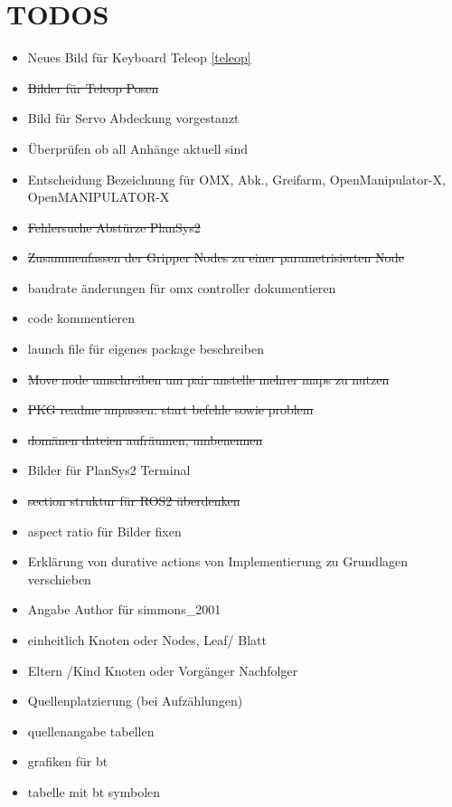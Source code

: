 \section{TODOS}
\begin{itemize}
    \item Neues Bild für Keyboard Teleop \ref{teleop}
    \item \sout{Bilder für Teleop Posen}
    \item Bild für Servo Abdeckung vorgestanzt
    \item Überprüfen ob all Anhänge aktuell sind
    \item Entscheidung Bezeichnung für OMX, Abk., Greifarm, OpenManipulator-X, OpenMANIPULATOR-X
    \item \sout{Fehlersuche Abstürze PlanSys2}
    \item \sout{Zusammenfassen der Gripper Nodes zu einer parametrisierten Node}
    \item baudrate änderungen für omx controller dokumentieren
    \item code kommentieren
    \item launch file für eigenes package beschreiben
    \item \sout{Move node umschreiben um pair anstelle mehrer maps zu nutzen}
    \item \sout{PKG readme anpassen: start befehle sowie problem}
    \item \sout{domänen dateien aufräumen, umbenennen}
    \item Bilder für PlanSys2 Terminal
    \item \sout{section struktur für ROS2 überdenken}
    \item aspect ratio für Bilder fixen
    \item Erklärung von durative actions von Implementierung zu Grundlagen verschieben
    \item Angabe Author für simmons\_2001
    \item einheitlich Knoten oder Nodes, Leaf/ Blatt
    \item Eltern /Kind Knoten oder Vorgänger Nachfolger
    \item Quellenplatzierung (bei Aufzählungen)
    \item quellenangabe tabellen
    \item grafiken für bt
    \item tabelle mit bt symbolen
\end{itemize}